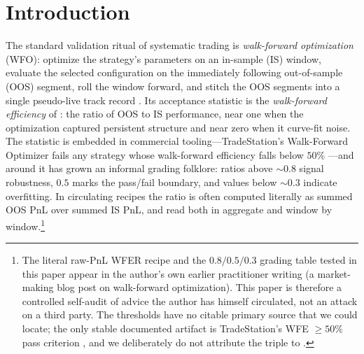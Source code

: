 \documentclass[11pt]{article}
\begin{document}
\begin{abstract}
mainly for the \emph{estimate}, not the deployment: the WFER--forward rank
correlation peaks at $0.52$ near nine folds and collapses to $0.23$ at one
fold, while deployed performance is flat for train windows of $126$ periods or
more. Across procedures, rolling deploys best (mean forward Sharpe $0.66$
vs.\ $0.62$ for anchored, CPCV-lite, and $k$-fold, $0.56$ for a single split);
naive shuffled $k$-fold is the most optimistic estimator ($+0.08$ Sharpe bias,
worse under drift and breaks); CPCV-lite's estimate ranks outcomes best
($\rho\,0.64$). In short: WFER is informative but redundant; its thresholds
are folklore and miscalibrated; the window-design advice is directionally
right and incompletely priced.
\end{abstract}

\section{Introduction}

The standard validation ritual of systematic trading is
\emph{walk-forward optimization} (WFO): optimize the strategy's parameters on
an in-sample (IS) window, evaluate the selected configuration on the
immediately following out-of-sample (OOS) segment, roll the window forward,
and stitch the OOS segments into a single pseudo-live track record
\citep{pardo1992design,pardo2008evaluation,tomasini2009trading}. Its
acceptance statistic is the \emph{walk-forward efficiency} of
\citet{pardo2008evaluation}: the ratio of OOS to IS performance, near one when
the optimization captured persistent structure and near zero when it
curve-fit noise. The statistic is embedded in commercial
tooling---TradeStation's Walk-Forward Optimizer fails any strategy whose
walk-forward efficiency falls below $50\%$
\citep{tradestation_wfo}---and around it has
grown an informal grading folklore: ratios above ${\sim}0.8$ signal
robustness, $0.5$ marks the pass/fail boundary, and values below
${\sim}0.3$ indicate overfitting. In circulating recipes the ratio is often
computed literally as summed OOS PnL over summed IS PnL, and read both in
aggregate and window by window.\footnote{The literal raw-PnL WFER recipe and
the $0.8/0.5/0.3$ grading table tested in this paper appear in the author's
own earlier practitioner writing (a market-making blog post on walk-forward
optimization). This paper is therefore a controlled self-audit of advice the
author has himself circulated, not an attack on a third party. The thresholds
have no citable primary source that we could locate; the only stable
documented artifact is TradeStation's WFE $\ge 50\%$ pass criterion
\citep{tradestation_wfo}, and we deliberately do not attribute the triple to
\citet{pardo2008evaluation}.}
\end{document}
